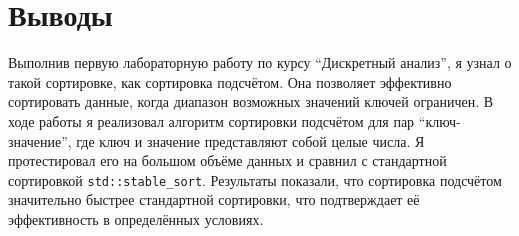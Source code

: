\section{Выводы}
Выполнив первую лабораторную работу по курсу \enquote{Дискретный анализ}, я узнал о такой сортировке, как сортировка подсчётом. Она позволяет эффективно сортировать данные, когда диапазон возможных значений ключей ограничен. В ходе работы я реализовал алгоритм сортировки подсчётом для пар \enquote{ключ-значение}, где ключ и значение представляют собой целые числа. Я протестировал его на большом объёме данных и сравнил с стандартной сортировкой \texttt{std::stable\_sort}. Результаты показали, что сортировка подсчётом значительно быстрее стандартной сортировки, что подтверждает её эффективность в определённых условиях.
\pagebreak
